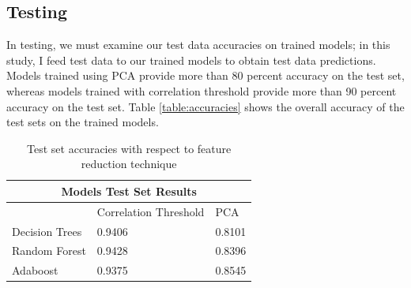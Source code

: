 \documentclass[12pt]{article}
\begin{document}
\subsection{Testing}
In testing, we must examine our test data accuracies on trained models; in this study, I feed test data to our trained models to obtain test data predictions. Models trained using PCA provide more than 80 percent accuracy on the test set, whereas models trained with correlation threshold provide more than 90 percent accuracy on the test set. Table \ref{table:accuracies} shows the overall accuracy of the test sets on the trained models.
\begin{table}[h!]
	\centering
	\begin{tabular}{ |p{3cm}|p{3cm}|p{3cm}|  }
		\hline
		\multicolumn{3}{|c|}{Models Test Set Results} \\
		\hline
		& Correlation Threshold & PCA \\
		\hline
		Decision Trees & 0.9406 &0.8101 \\
		Random Forest & 0.9428   & 0.8396 \\
		Adaboost &0.9375 & 0.8545 \\
		\hline
	\end{tabular}
	\caption{Test set accuracies with respect to feature reduction technique}
	\label{table:test_accuracies}
\end{table}
\end{document}
